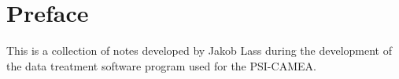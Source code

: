 \section*{Preface}
This is a collection of notes developed by Jakob Lass during the development of the data treatment software program used for the PSI-CAMEA.


